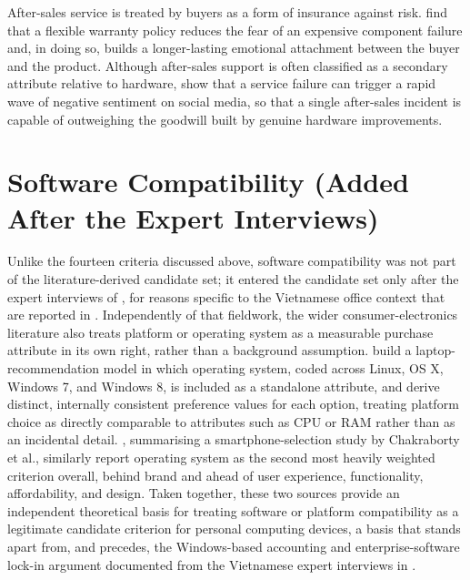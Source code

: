 After-sales service is treated by buyers as a form of insurance against risk.
\textcite{sostar_assessment_2023} find that a flexible warranty policy reduces the fear of
an expensive component failure and, in doing so, builds a longer-lasting emotional
attachment between the buyer and the product. Although after-sales support is often
classified as a secondary attribute relative to hardware, \textcite{maghsoudi_hybrid_2026}
show that a service failure can trigger a rapid wave of negative sentiment on social media,
so that a single after-sales incident is capable of outweighing the goodwill built by
genuine hardware improvements.

\section{Software Compatibility (Added After the Expert Interviews)}\label{app:theory-software}

Unlike the fourteen criteria discussed above, software compatibility was not part of the
literature-derived candidate set; it entered the candidate set only after the expert
interviews of , for reasons specific to the Vietnamese office
context that are reported in . Independently of that
fieldwork, the wider consumer-electronics literature also treats platform or operating
system as a measurable purchase attribute in its own right, rather than a background
assumption. \textcite{guan_cognitive_2022} build a laptop-recommendation model in which
operating system, coded across Linux, OS X, Windows 7, and Windows 8, is included as a
standalone attribute, and derive distinct, internally consistent preference values for each
option, treating platform choice as directly comparable to attributes such as CPU or RAM
rather than as an incidental detail. \textcite{weng_siew_lam_evaluation_2023}, summarising a
smartphone-selection study by Chakraborty et al., similarly report operating system as the
second most heavily weighted criterion overall, behind brand and ahead of user experience,
functionality, affordability, and design. Taken together, these two sources provide an
independent theoretical basis for treating software or platform compatibility as a
legitimate candidate criterion for personal computing devices, a basis that stands apart
from, and precedes, the Windows-based accounting and enterprise-software lock-in argument
documented from the Vietnamese expert interviews in .

